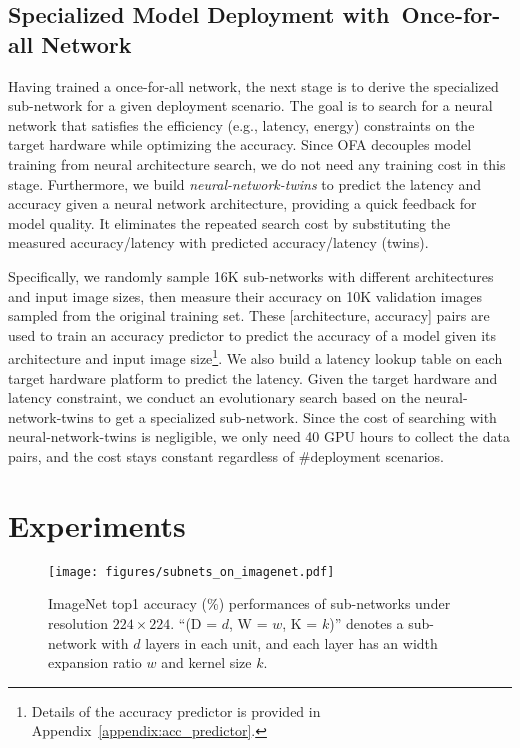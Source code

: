 \documentclass{article} \usepackage{iclr2020_conference,times}
\newcommand{\motherNet}{once-for-all network}
\newcommand{\motherNetCap}{Once-for-all Network}
\begin{document}
\subsection{Specialized Model Deployment with~\motherNetCap}
\label{sec:ofa_search}
Having trained a \motherNet, the next stage is to derive the specialized sub-network for a given deployment scenario. The goal is to search for a neural network that satisfies the efficiency (e.g., latency, energy) constraints on the target hardware while optimizing the accuracy. Since OFA decouples model training from neural architecture search, we do not need any training cost in this stage. Furthermore, we build \emph{neural-network-twins} to predict the latency and accuracy given a neural network architecture, providing a quick feedback for model quality. It eliminates the repeated search cost by substituting the measured accuracy/latency with predicted accuracy/latency (twins).

Specifically, we randomly sample 16K sub-networks with different architectures and input image sizes, then measure their accuracy on 10K validation images sampled from the original training set. These [architecture, accuracy] pairs are used to train an accuracy predictor to predict the accuracy of a model given its architecture and input image size\footnote{Details of the accuracy predictor is provided in Appendix~\ref{appendix:acc_predictor}.}. We also build a latency lookup table \citep{cai2019proxylessnas} on each target hardware platform to predict the latency. Given the target hardware and latency constraint, we conduct an evolutionary search \citep{real2018regularized} based on the neural-network-twins to get a specialized sub-network. 
Since the cost of searching with neural-network-twins is negligible, we only need 40 GPU hours to collect the data pairs, and the cost stays constant regardless of \#deployment scenarios.
 
\section{Experiments}

\begin{figure}[t]
\vspace{-25pt}
    \centering
    \texttt{[image: figures/subnets\_on\_imagenet.pdf]}
    \caption{ImageNet top1 accuracy (\%) performances of sub-networks under resolution $224\times224$. ``(D = $d$, W = $w$, K = $k$)'' denotes a sub-network with $d$ layers in each unit, and each layer has an width expansion ratio $w$ and kernel size $k$.}\label{fig:paranet_net_on_imagenet}
\end{figure}
\end{document}
